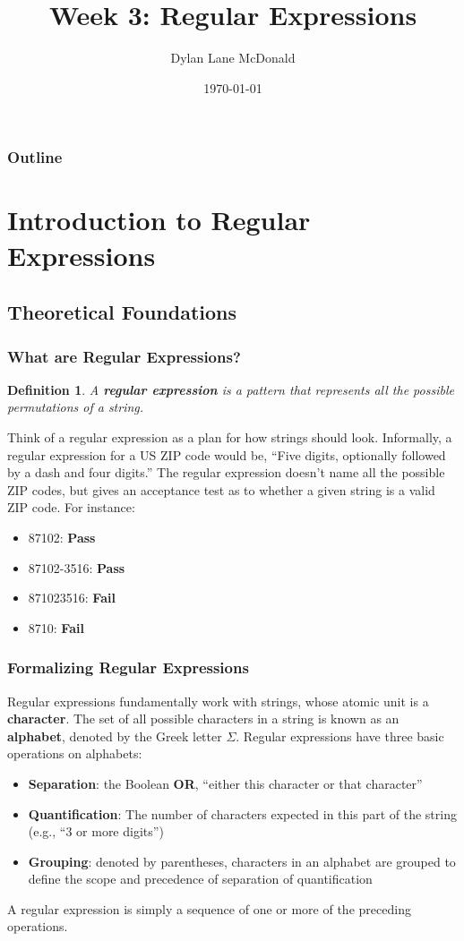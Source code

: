 \documentclass[aspectratio=169]{beamer}
\title{Week 3: Regular Expressions}
\author{Dylan Lane McDonald}
\institute{CNM STEMulus Center\\Web Development with PHP}
\date{\today}
\newtheorem{defn}{Definition}
\begin{document}
\lstset{language=PHP}
\begin{frame}
\titlepage
\end{frame}

\begin{frame}
\frametitle{Outline}
\tableofcontents
\end{frame}

\section{Introduction to Regular Expressions}
\subsection{Theoretical Foundations}
\begin{frame}
\frametitle{What are Regular Expressions?}
\begin{defn}
A \textbf{regular expression} is a pattern that represents all the possible permutations of a string.
\end{defn}
\pause
Think of a regular expression as a plan for how strings should look. Informally, a regular expression for a US ZIP code would be, ``Five digits, optionally followed by a dash and four digits.'' The regular expression doesn't name all the possible ZIP codes, but gives an acceptance test as to whether a given string is a valid ZIP code. For instance:
\begin{itemize}
	\item 87102: \textbf{Pass}
	\item 87102-3516: \textbf{Pass}
	\item 871023516: \textbf{Fail}
	\item 8710: \textbf{Fail}
\end{itemize}
\end{frame}

\begin{frame}
\frametitle{Formalizing Regular Expressions}
Regular expressions fundamentally work with strings, whose atomic unit is a \textbf{character}. The set of all possible characters in a string is known as an \textbf{alphabet}, denoted by the Greek letter $\Sigma$. Regular expressions have three basic operations on alphabets:
\begin{itemize}
	\item \textbf{Separation}: the Boolean \textbf{OR}, ``either this character or that character''
	\item \textbf{Quantification}: The number of characters expected in this part of the string (e.g., ``3 or more digits'')
	\item \textbf{Grouping}: denoted by parentheses, characters in an alphabet are grouped to define the scope and precedence of separation of quantification
\end{itemize}
A regular expression is simply a sequence of one or more of the preceding operations.
\end{frame}
\end{document}
